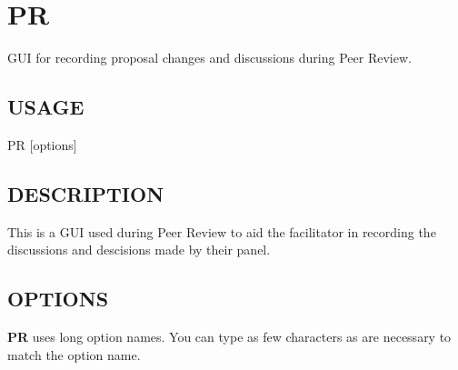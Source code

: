 \documentclass{article}
\begin{document}
\tableofcontents

\clearpage
\section{PR\label{PR}}


GUI for recording proposal changes and discussions during Peer Review.

\subsection*{USAGE\label{PR_USAGE}}


PR [options]

\subsection*{DESCRIPTION\label{PR_DESCRIPTION}}


This is a GUI used during Peer Review to aid the facilitator in recording
the discussions and descisions made by their panel.

\subsection*{OPTIONS\label{PR_OPTIONS}}


\textbf{PR} uses long option names.  You can type as few characters as
are necessary to match the option name.
\end{document}
